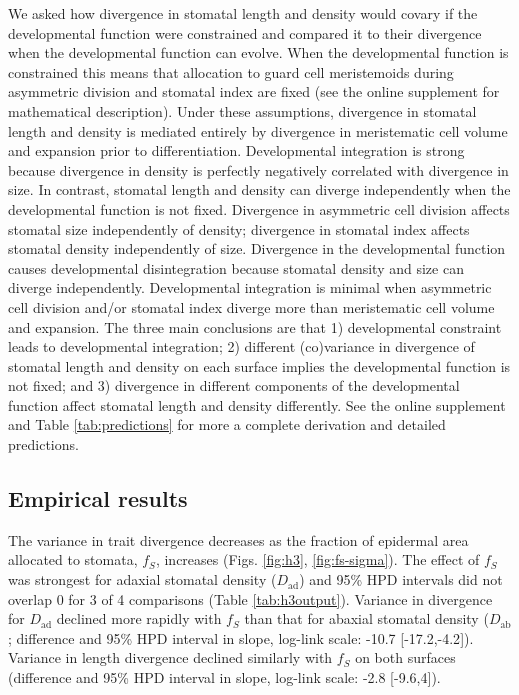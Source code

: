 \documentclass[
  12pt,
]{article}
\begin{document}
We asked how divergence in stomatal length and density would covary if the developmental function were constrained and compared it to their divergence when the developmental function can evolve. When the developmental function is constrained this means that allocation to guard cell meristemoids during asymmetric division and stomatal index are fixed (see the online supplement for mathematical description). Under these assumptions, divergence in stomatal length and density is mediated entirely by divergence in meristematic cell volume and expansion prior to differentiation. Developmental integration is strong because divergence in density is perfectly negatively correlated with divergence in size. In contrast, stomatal length and density can diverge independently when the developmental function is not fixed. Divergence in asymmetric cell division affects stomatal size independently of density; divergence in stomatal index affects stomatal density independently of size. Divergence in the developmental function causes developmental disintegration because stomatal density and size can diverge independently. Developmental integration is minimal when asymmetric cell division and/or stomatal index diverge more than meristematic cell volume and expansion. The three main conclusions are that 1) developmental constraint leads to developmental integration; 2) different (co)variance in divergence of stomatal length and density on each surface implies the developmental function is not fixed; and 3) divergence in different components of the developmental function affect stomatal length and density differently. See the online supplement and Table \ref{tab:predictions} for more a complete derivation and detailed predictions.

\hypertarget{empirical-results}{%
\subsection{Empirical results}\label{empirical-results}}

The variance in trait divergence decreases as the fraction of epidermal area allocated to stomata, \(f_S\), increases (Figs. \ref{fig:h3}, \ref{fig:fs-sigma}). The effect of \(f_S\) was strongest for adaxial stomatal density (\(D_\text{ad}\)) and 95\% HPD intervals did not overlap 0 for 3 of 4 comparisons (Table \ref{tab:h3output}). Variance in divergence for \(D_\text{ad}\) declined more rapidly with \(f_S\) than that for abaxial stomatal density (\(D_\text{ab}\); difference and 95\% HPD interval in slope, log-link scale: -10.7 {[}-17.2,-4.2{]}). Variance in length divergence declined similarly with \(f_S\) on both surfaces (difference and 95\% HPD interval in slope, log-link scale: -2.8 {[}-9.6,4{]}).
\end{document}
